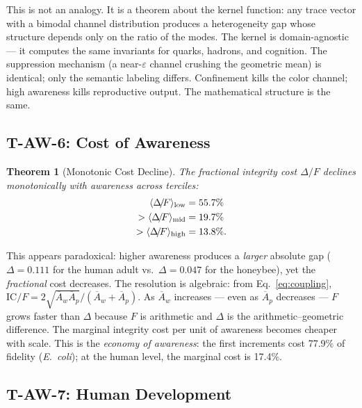 \documentclass[
  aps,
  prd,
  twocolumn,
  superscriptaddress,
  nofootinbib,
  floatfix
]{revtex4-2}
\newtheorem{theorem}{Theorem}
\newcommand{\eps}{\varepsilon}
\newcommand{\IC}{\mathrm{IC}}
\newcommand{\Aw}{\overline{A}_{\!w}}
\newcommand{\Ap}{\overline{A}_{\!p}}
\newcommand{\DeltaF}{\Delta\!/\!F}
\begin{document}
This is not an analogy.  It is a theorem about the kernel
function: any trace vector with a bimodal channel distribution
produces a heterogeneity gap whose structure depends only on
the ratio of the modes.  The kernel is domain-agnostic ---
it computes the same invariants for quarks, hadrons, and
cognition.  The suppression mechanism (a near-$\eps$ channel
crushing the geometric mean) is identical; only the semantic
labeling differs.  Confinement kills the color channel;
high awareness kills reproductive output.  The mathematical
structure is the same.

\subsection{T-AW-6: Cost of Awareness}

\begin{theorem}[Monotonic Cost Decline]\label{thm:TAW6}
The fractional integrity cost $\DeltaF$ declines
monotonically with awareness across terciles:
\begin{align}
  \langle\DeltaF\rangle_{\mathrm{low}} &= 55.7\% \notag\\
  > \langle\DeltaF\rangle_{\mathrm{mid}} &= 19.7\% \notag\\
  > \langle\DeltaF\rangle_{\mathrm{high}} &= 13.8\%.
\end{align}
\end{theorem}

This appears paradoxical: higher awareness produces a
\emph{larger} absolute gap ($\Delta = 0.111$ for the human
adult vs.\ $\Delta = 0.047$ for the honeybee), yet the
\emph{fractional} cost decreases.  The resolution is
algebraic: from Eq.~\ref{eq:coupling},
$\IC/F = 2\sqrt{\Aw\Ap}/(\Aw + \Ap)$.
As $\Aw$ increases --- even as $\Ap$ decreases --- $F$
grows faster than $\Delta$ because $F$ is arithmetic and
$\Delta$ is the arithmetic--geometric difference.  The
marginal integrity cost per unit of awareness becomes
cheaper with scale.  This is the \emph{economy of awareness}:
the first increments cost 77.9\% of fidelity (\textit{E.~coli});
at the human level, the marginal cost is 17.4\%.

\subsection{T-AW-7: Human Development}
\end{document}

